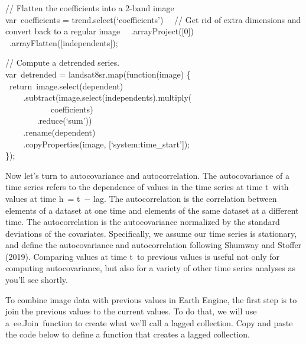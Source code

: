 \documentclass[
  letterpaper,
  DIV=11,
  numbers=noendperiod]{scrreprt}
\begin{document}
// Flatten the coefficients into a 2-band image\\
var~coefficients = trend.select(`coefficients')~ ~// Get rid of extra
dimensions and convert back to a regular image~
~.arrayProject({[}0{]})\\
\hspace*{0.333em} ~.arrayFlatten({[}independents{]});

// Compute a detrended series.\\
var~detrended = landsat8sr.map(function(image) \{~
~return~image.select(dependent)\\
\hspace*{0.333em} ~ ~ ~.subtract(image.select(independents).multiply(\\
\hspace*{0.333em} ~ ~ ~ ~ ~ ~ ~coefficients)\\
\hspace*{0.333em} ~ ~ ~ ~ ~.reduce(`sum'))\\
\hspace*{0.333em} ~ ~ ~.rename(dependent)\\
\hspace*{0.333em} ~ ~ ~.copyProperties(image,
{[}`system:time\_start'{]});\\
\});

Now let's turn to autocovariance and autocorrelation. The autocovariance
of a time series refers to the dependence of values in the time series
at time t~with values at time h~= t~− lag. The autocorrelation is the
correlation between elements of a dataset at one time and elements of
the same dataset at a different time. The autocorrelation is the
autocovariance normalized by the standard deviations of the covariates.
Specifically, we assume our time series is stationary, and define the
autocovariance and autocorrelation following Shumway and Stoffer (2019).
Comparing values at time t~to previous values is useful not only for
computing autocovariance, but also for a variety of other time series
analyses as you'll see shortly.

To combine image data with previous values in Earth Engine, the first
step is to join the previous values to the current values. To do that,
we will use a~ee.Join~function to create what we'll call a lagged
collection. Copy and paste the code below to define a function that
creates a lagged collection.
\end{document}
